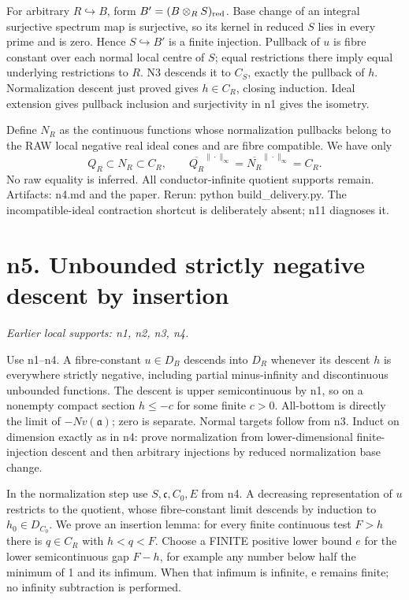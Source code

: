 \documentclass[11pt]{article}
\begin{document}
For arbitrary \(R\hookrightarrow B\), form \(B'=(B\otimes_R S)_{\rm red}\). Base change of an integral surjective spectrum map is surjective, so its kernel in reduced \(S\) lies in every prime and is zero. Hence \(S\hookrightarrow B'\) is a finite injection. Pullback of \(u\) is fibre constant over each normal local centre of \(S\); equal restrictions there imply equal underlying restrictions to \(R\). N3 descends it to \(C_S\), exactly the pullback of \(h\). Normalization descent just proved gives \(h\in C_R\), closing induction. Ideal extension gives pullback inclusion and surjectivity in n1 gives the isometry.

Define \(N_R\) as the continuous functions whose normalization pullbacks belong to the RAW local negative real ideal cones and are fibre compatible. We have only
\[
Q_R\subset N_R\subset C_R,\qquad
\overline{Q_R}^{\|\cdot\|_\infty}=\overline{N_R}^{\|\cdot\|_\infty}=C_R.
\]
No raw equality is inferred. All conductor-infinite quotient supports remain. Artifacts: n4.md and the paper. Rerun: python build\_delivery.py. The incompatible-ideal contraction shortcut is deliberately absent; n11 diagnoses it.

\section{n5. Unbounded strictly negative descent by insertion}
\textit{Earlier local supports: n1, n2, n3, n4.}

Use n1--n4. A fibre-constant \(u\in D_B\) descends into \(D_R\) whenever its descent \(h\) is everywhere strictly negative, including partial minus-infinity and discontinuous unbounded functions. The descent is upper semicontinuous by n1, so on a nonempty compact section \(h\le-c\) for some finite \(c>0\). All-bottom is directly the limit of \(-N v(\mathfrak a)\); zero is separate. Normal targets follow from n3. Induct on dimension exactly as in n4: prove normalization from lower-dimensional finite-injection descent and then arbitrary injections by reduced normalization base change.

In the normalization step use \(S,\mathfrak c,C_0,E\) from n4. A decreasing representation of \(u\) restricts to the quotient, whose fibre-constant limit descends by induction to \(h_0\in D_{C_0}\). We prove an insertion lemma: for every finite continuous test \(F>h\) there is \(q\in C_R\) with \(h<q<F\). Choose a FINITE positive lower bound \(e\) for the lower semicontinuous gap \(F-h\), for example any number below half the minimum of 1 and its infimum. When that infimum is infinite, e remains finite; no infinity subtraction is performed.
\end{document}
